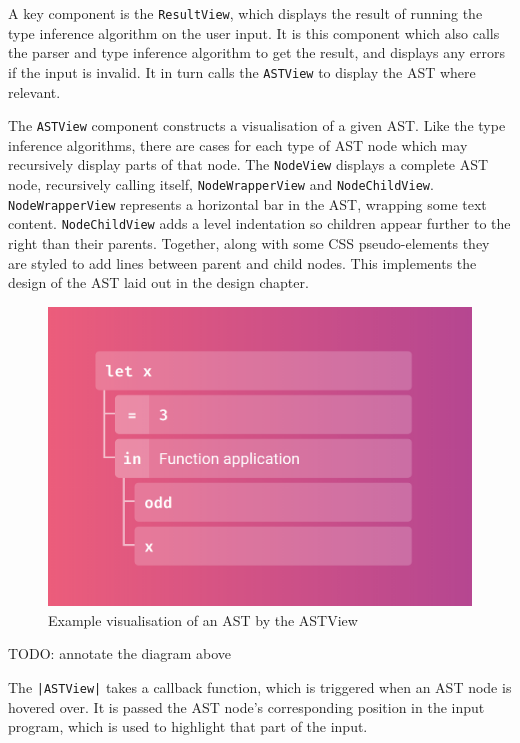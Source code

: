 \documentclass[a4paper,fleqn,oneside,12pt]{report}
\begin{document}
A key component is the \texttt{ResultView}, which displays the result of running the type inference algorithm on the user input. It is this component which also calls the parser and type inference algorithm to get the result, and displays any errors if the input is invalid. It in turn calls the \texttt{ASTView} to display the AST where relevant.

The \texttt{ASTView} component constructs a visualisation of a given AST. Like the type inference algorithms, there are cases for each type of AST node which may recursively display parts of that node. The \texttt{NodeView} displays a complete AST node, recursively calling itself, \texttt{NodeWrapperView} and \texttt{NodeChildView}. \texttt{NodeWrapperView} represents a horizontal bar in the AST, wrapping some text content. \texttt{NodeChildView} adds a level indentation so children appear further to the right than their parents. Together, along with some CSS pseudo-elements they are styled to add lines between parent and child nodes. This implements the design of the AST laid out in the design chapter.

{\centering \begin{figure}[h!]
  \centering
  \includegraphics[width=0.814\linewidth]{images/image1.png}
  \caption{Example visualisation of an AST by the ASTView}
\end{figure} \par}

TODO: annotate the diagram above

The \texttt{|ASTView|} takes a callback function, which is triggered when an AST node is hovered over. It is passed the AST node’s corresponding position in the input program, which is used to highlight that part of the input.
\end{document}
